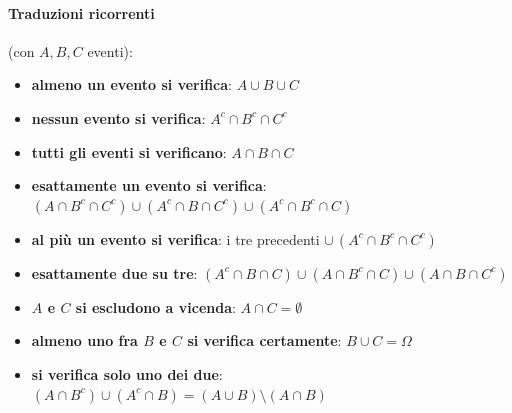 \documentclass[12pt]{extarticle} %
\begin{document}
\paragraph{Traduzioni ricorrenti} (con $A, B, C$ eventi):
\begin{itemize}
    \item \textbf{almeno un evento si verifica}: $A \cup B \cup C$
    \item \textbf{nessun evento si verifica}: $A^c \cap B^c \cap C^c$
    \item \textbf{tutti gli eventi si verificano}: $A \cap B \cap C$
    \item \textbf{esattamente un evento si verifica}: $(A \cap B^c \cap C^c) \cup (A^c \cap B \cap C^c) \cup (A^c \cap B^c \cap C)$
    \item \textbf{al più un evento si verifica}: i tre precedenti $\cup \, (A^c \cap B^c \cap C^c)$
    \item \textbf{esattamente due su tre}: $(A^c \cap B \cap C) \cup (A \cap B^c \cap C) \cup (A \cap B \cap C^c)$
    \item \textbf{$A$ e $C$ si escludono a vicenda}: $A \cap C = \emptyset$ 
    \item \textbf{almeno uno fra $B$ e $C$ si verifica certamente}: $B \cup C = \Omega$ 
    \item \textbf{si verifica solo uno dei due}: $(A \cap B^c) \cup (A^c \cap B) = (A \cup B) \setminus (A \cap B)$
\end{itemize}

\vspace{0.7cm}
\end{document}
